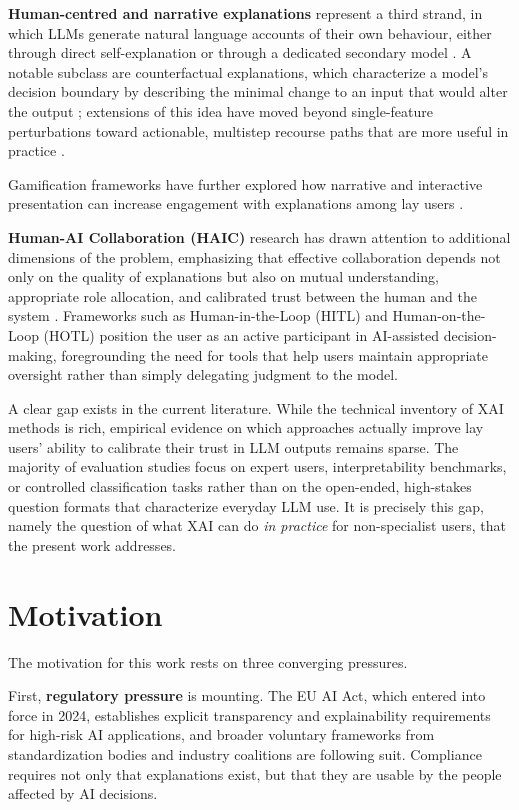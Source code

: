 \textbf{Human-centred and narrative explanations} represent a third strand, in which
LLMs generate natural language accounts of their own behaviour, either through
direct self-explanation or through a dedicated secondary model \cite{wu_usable_2025,you_gamifying_2024}.
A notable subclass are counterfactual explanations, which characterize a model's
decision boundary by describing the minimal change to an input that would alter
the output \cite{wachter_counterfactual_2018}; extensions of this idea have
moved beyond single-feature perturbations toward actionable, multistep
recourse paths that are more useful in practice \cite{rawal_beyond_2020}.

Gamification frameworks have further explored how narrative and interactive
presentation can increase engagement with explanations among lay users
\cite{you_gamifying_2024}.
 
\textbf{Human-AI Collaboration (HAIC)} research has drawn attention to additional dimensions
of the problem, emphasizing that effective collaboration depends not only on the quality
of explanations but also on mutual understanding, appropriate role allocation,
and calibrated trust between the human and the system
\cite{jeong_design_2025}.
Frameworks such as Human-in-the-Loop (HITL) and Human-on-the-Loop (HOTL)
position the user as an active participant in AI-assisted decision-making, foregrounding
the need for tools that help users maintain appropriate oversight rather than simply
delegating judgment to the model.
 
A clear gap exists in the current literature.
While the technical inventory of XAI methods is rich, empirical evidence on which
approaches actually improve lay users' ability to calibrate their trust in LLM outputs
remains sparse.
The majority of evaluation studies focus on expert users, interpretability benchmarks,
or controlled classification tasks rather than on the open-ended, high-stakes question
formats that characterize everyday LLM use.
It is precisely this gap, namely the question of what XAI can do \emph{in practice} for
non-specialist users, that the present work addresses.
 
\section{Motivation}
 
The motivation for this work rests on three converging pressures.
 
First, \textbf{regulatory pressure} is mounting.
The EU AI Act, which entered into force in 2024, establishes explicit transparency and
explainability requirements for high-risk AI applications, and broader voluntary
frameworks from standardization bodies and industry coalitions are following suit.
Compliance requires not only that explanations exist, but that they are usable
by the people affected by AI decisions.
 
